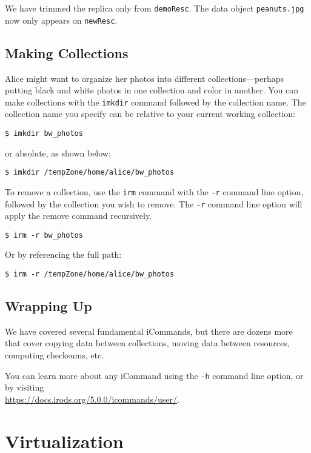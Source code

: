 \documentclass[10pt,oneside]{memoir}
\begin{document}
We have trimmed the replica only from \texttt{demoResc}. The data object \texttt{peanuts.jpg} now only appears on \texttt{newResc}.

\section{Making Collections}

Alice might want to organize her photos into different collections---perhaps putting black and white photos in one collection and color in another. You can make collections with the \texttt{imkdir} command followed by the collection name. The collection name you specify can be relative to your current working collection:

\begin{lstlisting}
$ imkdir bw_photos
\end{lstlisting}

or absolute, as shown below:

\begin{lstlisting}
$ imkdir /tempZone/home/alice/bw_photos
\end{lstlisting}

To remove a collection, use the \texttt{irm} command with the \texttt{-r} command line option, followed by the collection you wish to remove. The \texttt{-r} command line option will apply the remove command recursively.

\begin{lstlisting}
$ irm -r bw_photos
\end{lstlisting}

Or by referencing the full path:

\begin{lstlisting}
$ irm -r /tempZone/home/alice/bw_photos
\end{lstlisting}

\section{Wrapping Up}

We have covered several fundamental iCommands, but there are dozens more that cover copying data between collections, moving data between resources, computing checksums, etc.

You can learn more about any iCommand using the \texttt{-h} command line option, or by visiting \\
\url{https://docs.irods.org/5.0.0/icommands/user/}.

\chapter{Virtualization}
\end{document}
